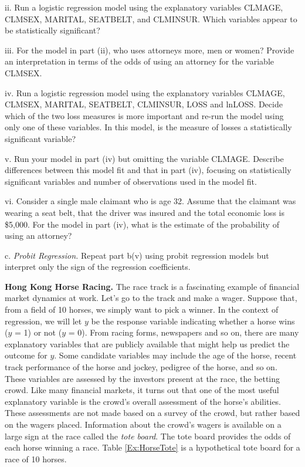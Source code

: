 \begin{exercises}
ii. Run a logistic regression model using the explanatory variables
CLMAGE, CLMSEX, MARITAL, SEATBELT, and CLMINSUR. Which variables
appear to be statistically significant?

iii. For the model in part (ii), who uses attorneys more, men or
women? Provide an interpretation in terms of the odds of using an
attorney for the variable CLMSEX.

iv. Run a logistic regression model using the explanatory variables
CLMAGE, CLMSEX, MARITAL, SEATBELT, CLMINSUR, LOSS and lnLOSS. Decide
which of the two loss measures is more important and re-run the
model using only one of these variables. In this model, is the
measure of losses a statistically significant variable?

v. Run your model in part (iv) but omitting the variable CLMAGE.
Describe differences between this model fit and that in part (iv),
focusing on statistically significant variables and number of
observations used in the model fit.

vi. Consider a single male claimant who is age 32. Assume that the
claimant was wearing a seat belt, that the driver was insured and
the total economic loss is \$5,000. For the model in part (iv), what
is the estimate of the probability of using an attorney?

c. \textit{Probit Regression.} Repeat part b(v) using probit
regression models but interpret only the sign of the regression
coefficients.

\linejed {}

\item \textbf{Hong Kong Horse Racing.}
 The race track is a fascinating example of financial market dynamics
at work. Let's go to the track and make a wager. Suppose that, from
a field of 10 horses, we simply want to pick a winner. In the
context of regression, we will let $y$ be the response variable
indicating whether a horse wins ($y$ = 1) or not ($y$ = 0). From
racing forms, newspapers and so on, there are many explanatory
variables that are publicly available that might help us predict the
outcome for $y$. Some candidate variables may include the age of the
horse, recent track performance of the horse and jockey, pedigree of
the horse, and so on. These variables are assessed by the investors
present at the race, the betting crowd. Like many financial markets,
it turns out that one of the most useful explanatory variable is the
crowd's overall assessment of the horse's abilities. These
assessments are not made based on a survey of the crowd, but rather
based on the wagers placed. Information about the crowd's wagers is
available on a large sign at the race called the \textit{tote
board}. The tote board provides the odds of each horse winning a
race. Table \ref{Ex:HorseTote} is a hypothetical tote board for a
race of 10 horses.



\end{exercises}
